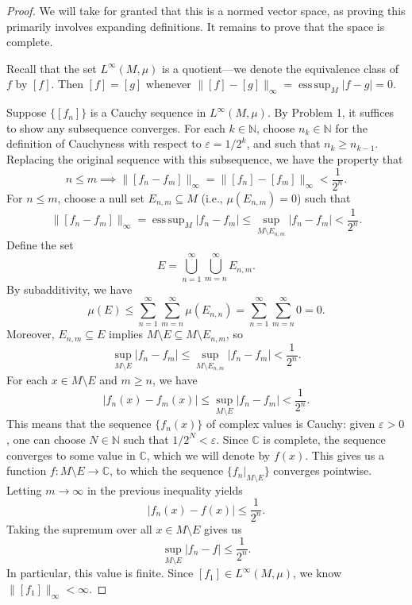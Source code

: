 \documentclass[12pt]{article}
\theoremstyle{definition}
\newcommand{\N}{\mathbb{N}}
\newcommand{\C}{\mathbb{C}}
\newcommand{\eps}{\varepsilon}
\newcommand{\<}{\langle}
\renewcommand{\>}{\rangle}
\newcommand{\seq}{\subseteq}
\newcommand{\esssup}{\operatorname{ess\,sup}}
\begin{document}
\begin{proof}
    We will take for granted that this is a normed vector space, as proving this primarily involves expanding definitions.
    It remains to prove that the space is complete.

    Recall that the set $L^\infty(M, \mu)$ is a quotient---we denote the equivalence class of $f$ by $[f]$.
    Then $[f] = [g]$ whenever $\|[f] - [g]\|_\infty = \esssup_M|f - g| = 0$.

    Suppose $\{[f_n]\}$ is a Cauchy sequence in $L^\infty(M, \mu)$.
    By Problem 1, it suffices to show any subsequence converges.
    For each $k \in \N$, choose $n_k \in \N$ for the definition of Cauchyness with respect to $\eps = 1/2^k$, and such that $n_k \geq n_{k-1}$.
    Replacing the original sequence with this subsequence, we have the property that
    \[
        n \leq m \implies \|[f_n - f_m]\|_\infty = \|[f_n] - [f_m]\|_\infty < \frac{1}{2^n}.
    \]
    For $n \leq m$, choose a null set $E_{n, m} \seq M$ (i.e., $\mu(E_{n,m}) = 0$) such that
    \[
        \|[f_n - f_m]\|_\infty
            = \esssup_M|f_n - f_m|
            \leq \sup_{M \setminus E_{n,m}} |f_n - f_m|
            < \frac{1}{2^n}.
    \]
    Define the set
    \[
        E = \bigcup_{n=1}^{\infty}\bigcup_{m=n}^{\infty} E_{n, m}.
    \]
    By subadditivity, we have
    \[
        \mu(E)
            \leq \sum_{n=1}^{\infty} \sum_{m=n}^{\infty} \mu(E_{n, n})
            = \sum_{n=1}^{\infty} \sum_{m=n}^{\infty} 0
            = 0.
    \]
    Moreover, $E_{n,m} \seq E$ implies $M \setminus E \seq M \setminus E_{n, m}$, so
    \[
        \sup_{M \setminus E} |f_n - f_m|
            \leq \sup_{M \setminus E_{n,m}} |f_n - f_m|
            < \frac{1}{2^n}.
    \]
    For each $x \in M \setminus E$ and $m \geq n$, we have
    \[
        |f_n(x) - f_m(x)| \leq \sup_{M \setminus E} |f_n - f_m| < \frac{1}{2^n}.
    \]
    This means that the sequence $\{f_n(x)\}$ of complex values is Cauchy: given $\eps > 0$, one can choose $N \in \N$ such that $1/2^N < \eps$.
    Since $\C$ is complete, the sequence converges to some value in $\C$, which we will denote by $f(x)$.
    This gives us a function $f : M \setminus E \to \C$, to which the sequence $\{f_n|_{M \setminus E}\}$ converges pointwise.
    Letting $m \to \infty$ in the previous inequality yields
    \[
        |f_n(x) - f(x)| \leq \frac{1}{2^n}.
    \]
    Taking the supremum over all $x \in M \setminus E$ gives us
    \[
        \sup_{M \setminus E} |f_n - f| \leq \frac{1}{2^n}.
    \]
    In particular, this value is finite.
    Since $[f_1] \in L^\infty(M, \mu)$, we know $\|[f_1]\|_\infty < \infty$.

\end{proof}
\end{document}

